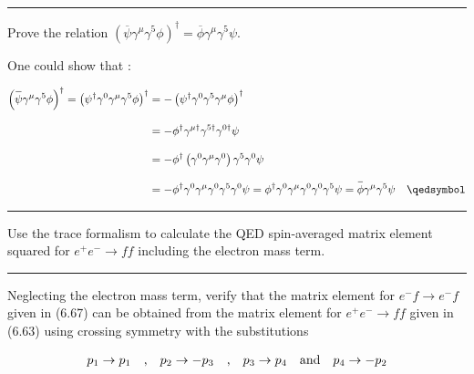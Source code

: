 \noindent\rule{7in}{1.5pt}


\begin{problem}{6.9}
Prove the relation $ \left(\overbar{\psi}\gamma^\mu\gamma^5\phi\right)^\dagger=\overbar{\phi}\gamma^\mu\gamma^5\psi$.
\end{problem}
\begin{solution}
One could show that :

\begin{align*}
    \left(\overbar{\psi}\gamma^\mu\gamma^5\phi\right)^\dagger = \left( \psi^\dagger \gamma^0 \gamma^\mu \gamma^5 \phi \right)^\dagger &= -  \left( \psi^\dagger \gamma^0  \gamma^5 \gamma^\mu \phi \right)^\dagger \\[0.12in]
    &= - \phi^\dagger \gamma^{\mu\dagger} \gamma^{5\dagger} \gamma^{0\dagger}  \psi \\[0.12in]
    &=  - \phi^\dagger \left(\gamma^0 \gamma^{\mu} \gamma^0\right) \gamma^5 \gamma^0  \psi \\[0.12in]
    &=  - \phi^\dagger \gamma^0    \gamma^\mu \gamma^0  \gamma^5 \gamma^0    \psi  = \phi^\dagger \gamma^0    \gamma^\mu \gamma^0  \gamma^0  \gamma^5   \psi =\overbar{\phi}\gamma^\mu\gamma^5\psi \qed 
\end{align*}
\end{solution}

\noindent\rule{7in}{1.5pt}


\begin{problem}{6.10}
Use the trace formalism to calculate the QED spin-averaged matrix element squared for $e^+e^-\to ff$ including the electron mass term.
\end{problem}
\begin{solution}

\end{solution}

\noindent\rule{7in}{1.5pt}


\begin{problem}{6.11}
Neglecting the electron mass term, verify that the matrix element for $e^- f \to e^- f$ given in (6.67) can be obtained from the matrix element for $e^+e^-\to ff$ given in (6.63) using crossing symmetry with the substitutions

\begin{align*}
    p_1 \to p_1 \quad \text{,} \quad p_2 \to -p_3 \quad \text{,} \quad p_3 \to p_4 \quad \text{and} \quad p_4 \to -p_2 \\
\end{align*}

\end{problem}
\begin{solution}

\end{solution}

